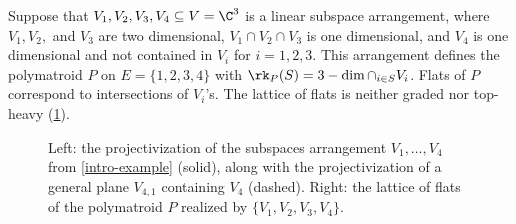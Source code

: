 \begin{exam}\label{intro-example}
  Suppose that $V_1,V_2,V_3,V_4 \subseteq V = \C^3$ is a linear subspace arrangement, where $V_1,V_2,$ and $V_3$ are two dimensional, $V_1 \cap V_2 \cap V_3$ is one dimensional, and $V_4$ is one dimensional and not contained in $V_i$ for $i=1,2,3$.
  This arrangement defines the polymatroid $P$ on $E = \{1,2,3,4\}$ with $\rk_P(S) = 3 - \dim \cap_{i \in S} V_i$.
  Flats of $P$ correspond to intersections of $V_i$'s. The lattice of flats is neither graded nor top-heavy  (\cref{intro-picture}).
\begin{figure}[ht]
    \hspace{-1cm}
    \begin{minipage}{2.5in}
      \centering

      \end{minipage}
      \quad
      \begin{minipage}{2.5in}
\end{minipage}
        \caption{Left: the projectivization of the subspaces arrangement $V_1, \ldots, V_4$ from \cref{intro-example} (solid), along with the projectivization of a general plane $V_{4,1}$ containing $V_4$ (dashed). Right: the lattice of flats of the polymatroid $P$ realized by $\{V_1,V_2,V_3,V_4\}$.}
        \label{intro-picture}
      \end{figure}




\end{exam}
